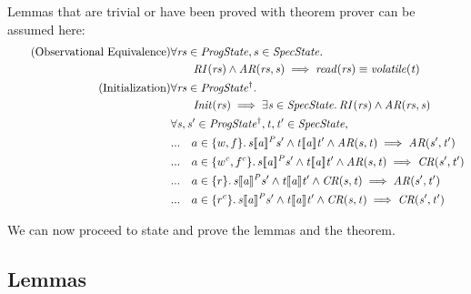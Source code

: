 \documentclass[letterpaper,twocolumn,10pt]{article}
\theoremstyle{definition}
\renewcommand{\i}[1]{\ensuremath{\mathit{#1}}}
\begin{document}
Lemmas that are trivial or have been proved with theorem prover can be assumed here:
\begin{align*}
	\tag{Observational Equivalence} & \forall \i{rs} \in \i{ProgState},s \in \i{SpecState} \ldotp \\
	& \qquad \i{RI(rs)} \land \i{AR(rs, s)} \implies \i{read(rs)} \equiv \i{volatile(t)} \\
	\tag{Initialization}\label{Initialization} &\forall \i{rs} \in \i{ProgState^\dagger} \ldotp\\
	&\qquad \i{Init(rs) \implies \exists s \in SpecState \ldotp RI(rs) \land AR(rs, s)}\\
	&\i{\forall s, s' \in ProgState^\dagger, t, t' \in SpecState,}\\
	&...	 \quad a \in \{w, f\} \ldotp \i{s \llbracket a \rrbracket^P s' \land t \llbracket a \rrbracket t' \land AR(s, t) \implies AR(s', t')}\\
	&...	 \quad a \in \{w^c, f^c\} \ldotp \i{s \llbracket a \rrbracket^P s' \land t \llbracket a \rrbracket t' \land AR(s, t) \implies CR(s', t')}\\
	&...	 \quad a \in \{r\} \ldotp \i{s \llbracket a \rrbracket^P s' \land t \llbracket a \rrbracket t' \land CR(s, t) \implies AR(s', t')}\\
	&...	 \quad a \in \{r^c\} \ldotp \i{s \llbracket a \rrbracket^P s' \land t \llbracket a \rrbracket t' \land CR(s, t) \implies CR(s', t')}\\
\end{align*}

We can now proceed to state and prove the lemmas and the theorem.

\subsection{Lemmas}
\end{document}
